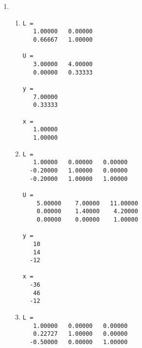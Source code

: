 \documentclass[a4paper]{article}
\begin{document}
\section{}
\begin{enumerate}
\item
  \begin{enumerate}
  \item %
\begin{verbatim}
L =
   1.00000   0.00000
   0.66667   1.00000

U =
   3.00000   4.00000
   0.00000   0.33333

y =
   7.00000
   0.33333

x =
   1.00000
   1.00000
\end{verbatim}

  \item %
\begin{verbatim}
L =
   1.00000   0.00000   0.00000
  -0.20000   1.00000   0.00000
  -0.20000   1.00000   1.00000

U =
    5.00000    7.00000   11.00000
    0.00000    1.40000    4.20000
    0.00000    0.00000    1.00000

y =
   10
   14
  -12

x =
  -36
   46
  -12
\end{verbatim}

  \item %
\begin{verbatim}
L =
   1.00000   0.00000   0.00000
   0.22727   1.00000   0.00000
  -0.50000   0.00000   1.00000


\end{verbatim}
\end{enumerate}
\end{enumerate}
\end{document}
